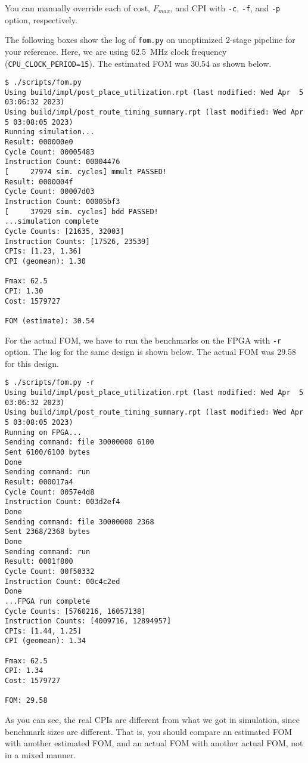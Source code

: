 You can manually override each of cost, $F_{max}$, and CPI with \verb|-c|, \verb|-f|, and \verb|-p| option, respectively.

The following boxes show the log of \verb|fom.py| on unoptimized 2-stage pipeline for your reference.
Here, we are using 62.5~MHz clock frequency (\verb|CPU_CLOCK_PERIOD=15|).
The estimated FOM was 30.54 as shown below.
\begin{verbatim}
$ ./scripts/fom.py
Using build/impl/post_place_utilization.rpt (last modified: Wed Apr  5 03:06:32 2023)
Using build/impl/post_route_timing_summary.rpt (last modified: Wed Apr  5 03:08:05 2023)
Running simulation...
Result: 000000e0
Cycle Count: 00005483
Instruction Count: 00004476
[     27974 sim. cycles] mmult PASSED!
Result: 0000004f
Cycle Count: 00007d03
Instruction Count: 00005bf3
[     37929 sim. cycles] bdd PASSED!
...simulation complete
Cycle Counts: [21635, 32003]
Instruction Counts: [17526, 23539]
CPIs: [1.23, 1.36]
CPI (geomean): 1.30

Fmax: 62.5
CPI: 1.30
Cost: 1579727

FOM (estimate): 30.54
\end{verbatim}

For the actual FOM, we have to run the benchmarks on the FPGA with \verb|-r| option.
The log for the same design is shown below.
The actual FOM was 29.58 for this design.
\begin{verbatim}
$ ./scripts/fom.py -r
Using build/impl/post_place_utilization.rpt (last modified: Wed Apr  5 03:06:32 2023)
Using build/impl/post_route_timing_summary.rpt (last modified: Wed Apr  5 03:08:05 2023)
Running on FPGA...
Sending command: file 30000000 6100
Sent 6100/6100 bytes
Done
Sending command: run
Result: 000017a4
Cycle Count: 0057e4d8
Instruction Count: 003d2ef4
Done
Sending command: file 30000000 2368
Sent 2368/2368 bytes
Done
Sending command: run
Result: 0001f800
Cycle Count: 00f50332
Instruction Count: 00c4c2ed
Done
...FPGA run complete
Cycle Counts: [5760216, 16057138]
Instruction Counts: [4009716, 12894957]
CPIs: [1.44, 1.25]
CPI (geomean): 1.34

Fmax: 62.5
CPI: 1.34
Cost: 1579727

FOM: 29.58
\end{verbatim}

As you can see, the real CPIs are different from what we got in simulation,
since benchmark sizes are different.
That is, you should compare an estimated FOM with another estimated FOM,
and an actual FOM with another actual FOM, not in a mixed manner.


